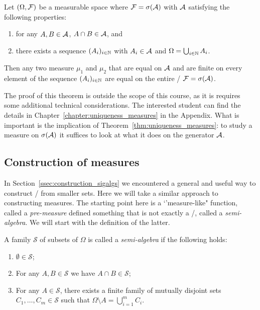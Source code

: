 \begin{theorem}\label{thm:uniqueness_measures}
Let $(\Omega ,\mathcal F)$ be a measurable space where $\mathcal F = \sigma(\mathcal A)$ with $\mathcal A$ satisfying the following properties:
\begin{enumerate}
\item for any $A, B \in \mathcal A$, $A \cap B \in \mathcal A$, and
\item there exists a sequence $(A_i)_{i \in \mathbb N}$ with $A_i \in \mathcal A$ and $\Omega = \bigcup_{i \in \mathbb N} A_i$.
\end{enumerate}
Then any two measure $\mu_1$ and $\mu_2$ that are equal on $\mathcal A$ and are finite on every element of the sequence $(A_i)_{i \in \mathbb N}$ are equal on the entire \sigalg/ $\mathcal F = \sigma(\mathcal A)$.
\end{theorem}

The proof of this theorem is outside the scope of this course, as it is requires some additional technical considerations. The interested student can find the details in Chapter~\ref{chapter:uniqueness_measures} in the Appendix. What is important is the implication of Theorem~\ref{thm:uniqueness_measures}: to study a measure on $\sigma(\mathcal A)$ it suffices to look at what it does on the generator $\mathcal A$.

\subsection{Construction of measures}

In Section~\ref{ssec:construction_sigalgs} we encountered a general and useful way to construct \sigalgs/ from smaller sets. Here we will take a similar approach to constructing measures. The starting point here is a `'measure-like" function, called a \emph{pre-measure} defined something that is not exactly a \sigalg/, called a \emph{semi-algebra}. We will start with the definition of the latter.

\begin{definition}\label{def:semi_algebra}
A family $\mathcal{S}$ of subsets of $\Omega$ is called a \emph{semi-algebra} if the following holds:
\begin{enumerate}
\item $\emptyset \in \mathcal{S}$;
\item For any $A, B \in \mathcal{S}$ we have $A \cap B \in \mathcal{S}$;
\item For any $A \in \mathcal{S}$, there exists a finite family of mutually disjoint sets $C_1, \dots, C_m \in \mathcal{S}$ such that $\Omega \setminus A = \bigcup_{i = 1}^m C_i$.
\end{enumerate}
\end{definition}

